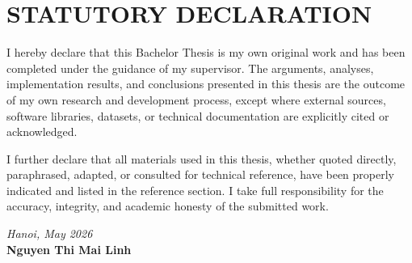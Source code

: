 \chapter*{STATUTORY DECLARATION}
{}

I hereby declare that this Bachelor Thesis is my own original work and
has been completed under the guidance of my supervisor. The arguments,
analyses, implementation results, and conclusions presented in this
thesis are the outcome of my own research and development process,
except where external sources, software libraries, datasets, or
technical documentation are explicitly cited or acknowledged.

I further declare that all materials used in this thesis, whether quoted
directly, paraphrased, adapted, or consulted for technical reference,
have been properly indicated and listed in the reference section. I take
full responsibility for the accuracy, integrity, and academic honesty of
the submitted work.

\vspace{1.5cm}
\begin{flushright}
  \textit{Hanoi, May 2026}\\
  \textbf{Nguyen Thi Mai Linh}
\end{flushright}
